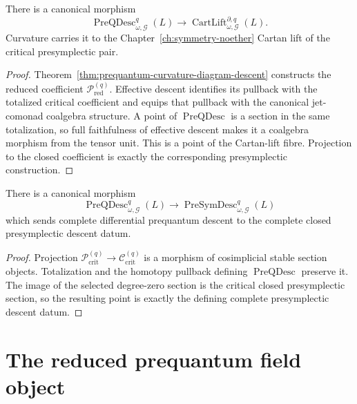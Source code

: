 \begin{theorem}
\label{thm:prequantum-complete-descent-supplies-cartan-pair}
There is a canonical morphism
\[
\boxed{
\operatorname{PreQDesc}_{\omega,\mathcal G}^{q}(L)
\longrightarrow
\operatorname{CartLift}^{\partial,q}_{\omega,\mathcal G}(L).
}
\]
Curvature carries it to the Chapter~\ref{ch:symmetry-noether} Cartan lift of the
critical presymplectic pair.
\end{theorem}

\begin{proof}
Theorem~\ref{thm:prequantum-curvature-diagram-descent} constructs the reduced
coefficient $\mathscr P_{\mathrm{red}}^{(q)}$.  Effective descent identifies its
pullback with the totalized critical coefficient and equips that pullback with the
canonical jet-comonad coalgebra structure.  A point of
$\operatorname{PreQDesc}$ is a section in the same totalization, so full
faithfulness of effective descent makes it a coalgebra morphism from the tensor
unit.  This is a point of the Cartan-lift fibre.  Projection to the closed
coefficient is exactly the corresponding presymplectic construction.
\end{proof}

\begin{theorem}
\label{thm:prequantum-curvature-complete-descent}
There is a canonical morphism
\[
\boxed{
\operatorname{PreQDesc}_{\omega,\mathcal G}^{q}(L)
\longrightarrow
\operatorname{PreSymDesc}_{\omega,\mathcal G}^{q}(L)
}
\]
which sends complete differential prequantum descent to the complete closed
presymplectic descent datum.
\end{theorem}

\begin{proof}
Projection
$\mathscr P_{\mathrm{crit}}^{(q)}\to\mathscr C_{\mathrm{crit}}^{(q)}$
is a morphism of cosimplicial stable section objects.  Totalization and the
homotopy pullback defining $\operatorname{PreQDesc}$ preserve it.  The image of
the selected degree-zero section is the critical closed presymplectic section, so
the resulting point is exactly the defining complete presymplectic descent datum.
\end{proof}

\section{The reduced prequantum field object}
\label{sec:prequantum-reduced-field-object}

